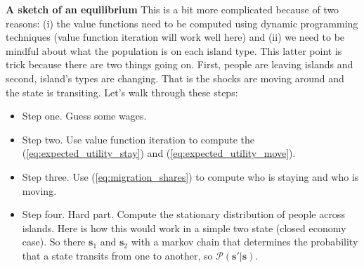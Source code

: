 \documentclass[pdftex,12pt]{article}
\begin{document}
\medskip
\noindent \textbf{A sketch of an equilibrium} This is a bit more complicated because of two reasons: (i) the value functions need to be computed using dynamic programming techniques (value function iteration will work well here) and (ii) we need to be mindful about what the population is on each island type. This latter point is trick because there are two things going on. First, people are leaving islands and second, island's types are changing. That is the shocks are moving around and the state is transiting. Let's walk through these steps:
\begin{itemize}
\item Step one. Guess some wages.

\item Step two. Use value function iteration to compute the (\ref{eq:expected_utility_stay}) and (\ref{eq:expected_utility_move}).

\item Step three. Use (\ref{eq:migration_shares}) to compute who is staying and who is moving.

\item Step four. Hard part. Compute the stationary distribution of people across islands. Here is how this would work in a simple two state (closed economy case). So there $\textbf{s}_1$ and $\textbf{s}_2$ with a markov chain that determines the probability that a state transits from one to another, so $\mathcal{P}(\textbf{s}' | \textbf{s})$. 
    

\end{itemize}
\end{document}
